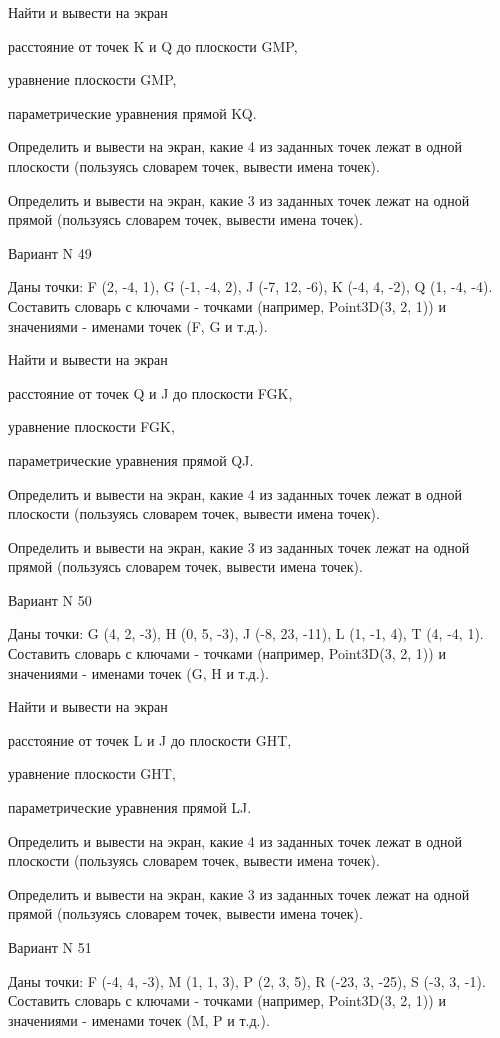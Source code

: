 \documentclass[11pt]{report}
\begin{document}
 
Найти и вывести на экран


расстояние от точек K и Q до плоскости GMP,

 
уравнение плоскости GMP,

 
параметрические уравнения прямой KQ.


Определить и вывести на экран, какие 4 из заданных точек лежат в одной плоскости (пользуясь словарем точек, вывести имена точек).


Определить и вывести на экран, какие 3 из заданных точек лежат на одной прямой (пользуясь словарем точек, вывести имена точек).

Вариант N 49

Даны точки: F (2, -4, 1), G (-1, -4, 2), J (-7, 12, -6), K (-4, 4, -2), Q (1, -4, -4).
Составить словарь с ключами - точками (например, Point3D(3, 2, 1)) и значениями - именами точек (F, G и т.д.).

 
Найти и вывести на экран


расстояние от точек Q и J до плоскости FGK,

 
уравнение плоскости FGK,

 
параметрические уравнения прямой QJ.


Определить и вывести на экран, какие 4 из заданных точек лежат в одной плоскости (пользуясь словарем точек, вывести имена точек).


Определить и вывести на экран, какие 3 из заданных точек лежат на одной прямой (пользуясь словарем точек, вывести имена точек).

Вариант N 50

Даны точки: G (4, 2, -3), H (0, 5, -3), J (-8, 23, -11), L (1, -1, 4), T (4, -4, 1).
Составить словарь с ключами - точками (например, Point3D(3, 2, 1)) и значениями - именами точек (G, H и т.д.).

 
Найти и вывести на экран


расстояние от точек L и J до плоскости GHT,

 
уравнение плоскости GHT,

 
параметрические уравнения прямой LJ.


Определить и вывести на экран, какие 4 из заданных точек лежат в одной плоскости (пользуясь словарем точек, вывести имена точек).


Определить и вывести на экран, какие 3 из заданных точек лежат на одной прямой (пользуясь словарем точек, вывести имена точек).

Вариант N 51

Даны точки: F (-4, 4, -3), M (1, 1, 3), P (2, 3, 5), R (-23, 3, -25), S (-3, 3, -1).
Составить словарь с ключами - точками (например, Point3D(3, 2, 1)) и значениями - именами точек (M, P и т.д.).
\end{document}
